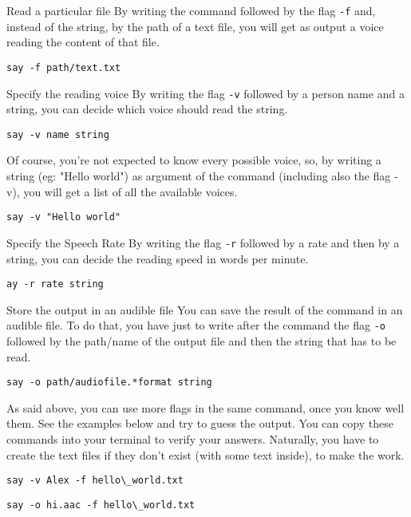 \documentclass[hidelinks,12pt,a4paper,numbers=enddot]{scrartcl}
\begin{document}
Read a particular file
By writing the command followed by the flag \texttt{-f} and, instead
of the string, by the path of a text file, you will get as output a voice
reading the content of that file.

\begin{verbatim}
say -f path/text.txt
\end{verbatim}

Specify the reading voice
By writing the flag \texttt{-v} followed by a person name and a string, you
can decide which voice should read the string.

\begin{verbatim}
say -v name string
\end{verbatim}

Of course, you're not expected to know every possible voice,
so, by writing a string (eg: "Hello world") as argument of the command
(including also the flag -v), you will get a list of all the available voices.

\begin{verbatim}
say -v "Hello world"
\end{verbatim}

Specify the Speech Rate
By writing the flag \texttt{-r} followed by a rate and then by a
string, you can decide the reading speed in words per minute.

\begin{verbatim}
ay -r rate string
\end{verbatim}

Store the output in an audible file
You can save the result of the command in an audible file. To do that,
you have just to write after the command the flag \texttt{-o} followed
by the path/name of the output file and then the string that has to be read.

\begin{verbatim}
say -o path/audiofile.*format string
\end{verbatim}

As said above, you can use more flags in the same command, once you know
well them. See the examples below and try to guess the output. You can
copy these commands into your terminal to verify your answers. Naturally,
you have to create the text files if they don't exist (with some text
inside), to make the work.

\begin{verbatim}
say -v Alex -f hello\_world.txt
\end{verbatim}

\begin{verbatim}
say -o hi.aac -f hello\_world.txt
\end{verbatim}
\end{document}
